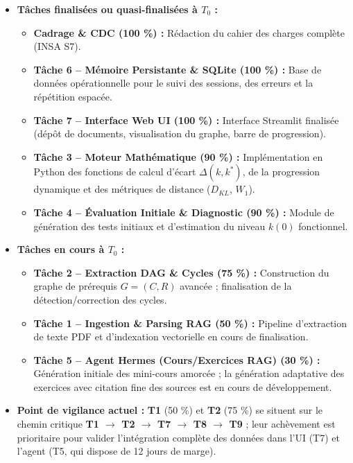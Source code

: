 \documentclass[11pt, a4paper]{article}
\begin{document}
\begin{itemize}
    \item \textbf{Tâches finalisées ou quasi-finalisées à $T_0$ :}
    \begin{itemize}
        \item \textbf{Cadrage \& CDC (100 \%) :} Rédaction du cahier des charges complète (INSA S7).
        \item \textbf{Tâche 6 -- Mémoire Persistante \& SQLite (100 \%) :} Base de données opérationnelle pour le suivi des sessions, des erreurs et la répétition espacée.
        \item \textbf{Tâche 7 -- Interface Web UI (100 \%) :} Interface Streamlit finalisée (dépôt de documents, visualisation du graphe, barre de progression).
        \item \textbf{Tâche 3 -- Moteur Mathématique (90 \%) :} Implémentation en Python des fonctions de calcul d'écart $\Delta(k, k^*)$, de la progression dynamique et des métriques de distance ($D_{KL}$, $W_1$).
        \item \textbf{Tâche 4 -- Évaluation Initiale \& Diagnostic (90 \%) :} Module de génération des tests initiaux et d'estimation du niveau $k(0)$ fonctionnel.
    \end{itemize}
    \item \textbf{Tâches en cours à $T_0$ :}
    \begin{itemize}
        \item \textbf{Tâche 2 -- Extraction DAG \& Cycles (75 \%) :} Construction du graphe de prérequis $G=(C,R)$ avancée ; finalisation de la détection/correction des cycles.
        \item \textbf{Tâche 1 -- Ingestion \& Parsing RAG (50 \%) :} Pipeline d'extraction de texte PDF et d'indexation vectorielle en cours de finalisation.
        \item \textbf{Tâche 5 -- Agent Hermes (Cours/Exercices RAG) (30 \%) :} Génération initiale des mini-cours amorcée ; la génération adaptative des exercices avec citation fine des sources est en cours de développement.
    \end{itemize}
    \item \textbf{Point de vigilance actuel :} \textbf{T1} (50 \%) et \textbf{T2} (75 \%) se situent sur le chemin critique \textbf{T1 $\rightarrow$ T2 $\rightarrow$ T7 $\rightarrow$ T8 $\rightarrow$ T9} ; leur achèvement est prioritaire pour valider l'intégration complète des données dans l'UI (T7) et l'agent (T5, qui dispose de 12 jours de marge).
\end{itemize}
\end{document}
